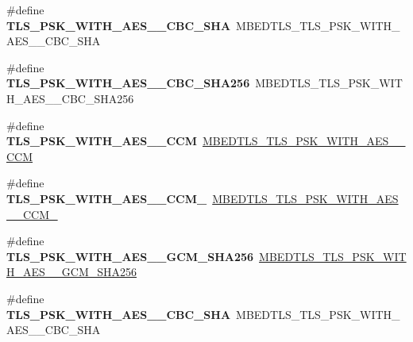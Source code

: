 \begin{DoxyCompactItemize}
\item 
\mbox{\label{compat-1_83_8h_ac2b351a80dba61fd99ce858986b9ce7b}} 
\#define {\bfseries T\+L\+S\+\_\+\+P\+S\+K\+\_\+\+W\+I\+T\+H\+\_\+\+A\+E\+S\+\_\+\_\+\+C\+B\+C\+\_\+\+S\+HA}~M\+B\+E\+D\+T\+L\+S\+\_\+\+T\+L\+S\+\_\+\+P\+S\+K\+\_\+\+W\+I\+T\+H\+\_\+\+A\+E\+S\+\_\+\_\+\+C\+B\+C\+\_\+\+S\+HA
\item 
\mbox{\label{compat-1_83_8h_a1676d111553c1755ca80e87b79408679}} 
\#define {\bfseries T\+L\+S\+\_\+\+P\+S\+K\+\_\+\+W\+I\+T\+H\+\_\+\+A\+E\+S\+\_\+\_\+\+C\+B\+C\+\_\+\+S\+H\+A256}~M\+B\+E\+D\+T\+L\+S\+\_\+\+T\+L\+S\+\_\+\+P\+S\+K\+\_\+\+W\+I\+T\+H\+\_\+\+A\+E\+S\+\_\+\_\+\+C\+B\+C\+\_\+\+S\+H\+A256
\item 
\mbox{\label{compat-1_83_8h_ab21d1b41ce789950742e80045c788366}} 
\#define {\bfseries T\+L\+S\+\_\+\+P\+S\+K\+\_\+\+W\+I\+T\+H\+\_\+\+A\+E\+S\+\_\+\_\+\+C\+CM}~\mbox{\hyperlink{ssl__ciphersuites_8h_aca8fbd49efcde7d69143a64d337eeff4}{M\+B\+E\+D\+T\+L\+S\+\_\+\+T\+L\+S\+\_\+\+P\+S\+K\+\_\+\+W\+I\+T\+H\+\_\+\+A\+E\+S\+\_\+\_\+\+C\+CM}}
\item 
\mbox{\label{compat-1_83_8h_aff0da1b90c7430294fd9f04e3f0e1ca3}} 
\#define {\bfseries T\+L\+S\+\_\+\+P\+S\+K\+\_\+\+W\+I\+T\+H\+\_\+\+A\+E\+S\+\_\+\_\+\+C\+C\+M\+\_}~\mbox{\hyperlink{ssl__ciphersuites_8h_a2633488de6be17d4a5b004f8ab9f95e0}{M\+B\+E\+D\+T\+L\+S\+\_\+\+T\+L\+S\+\_\+\+P\+S\+K\+\_\+\+W\+I\+T\+H\+\_\+\+A\+E\+S\+\_\+\_\+\+C\+C\+M\+\_}}
\item 
\mbox{\label{compat-1_83_8h_a7186ff3897daf03d2da7b9d5768e63ec}} 
\#define {\bfseries T\+L\+S\+\_\+\+P\+S\+K\+\_\+\+W\+I\+T\+H\+\_\+\+A\+E\+S\+\_\+\_\+\+G\+C\+M\+\_\+\+S\+H\+A256}~\mbox{\hyperlink{ssl__ciphersuites_8h_a59e8a3af727d077b47322d90a5592001}{M\+B\+E\+D\+T\+L\+S\+\_\+\+T\+L\+S\+\_\+\+P\+S\+K\+\_\+\+W\+I\+T\+H\+\_\+\+A\+E\+S\+\_\+\_\+\+G\+C\+M\+\_\+\+S\+H\+A256}}
\item 
\mbox{\label{compat-1_83_8h_ace82139ba8e6700726abfa5c77245fbe}} 
\#define {\bfseries T\+L\+S\+\_\+\+P\+S\+K\+\_\+\+W\+I\+T\+H\+\_\+\+A\+E\+S\+\_\+\_\+\+C\+B\+C\+\_\+\+S\+HA}~M\+B\+E\+D\+T\+L\+S\+\_\+\+T\+L\+S\+\_\+\+P\+S\+K\+\_\+\+W\+I\+T\+H\+\_\+\+A\+E\+S\+\_\+\_\+\+C\+B\+C\+\_\+\+S\+HA

\end{DoxyCompactItemize}
